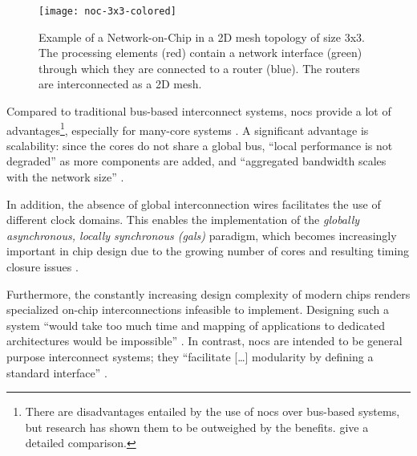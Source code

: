 \begin{figure}
    \centering
    \texttt{[image: noc-3x3-colored]}
    \caption[Example of a 3x3 mesh NoC]{Example of a Network-on-Chip in a 2D mesh topology of size 3x3. The processing elements (red) contain a network interface
    (green) through which they are connected to a router (blue). The routers are interconnected as a 2D mesh.}
    \label{fig:nocexample}
\end{figure}

Compared to traditional bus-based interconnect systems, \glspl{noc} provide a lot of advantages\footnote{There are disadvantages entailed by
the use of \glspl{noc} over bus-based systems, but research has shown them to be outweighed by the benefits. \citeauthor{tatas16designingnocs}
\cite{tatas16designingnocs} give a detailed comparison.}, especially for many-core systems
\cite[5\psqq]{tatas16designingnocs}. A significant advantage is scalability: since the cores do not share a global bus, \enquote{local performance is not
degraded} \cite[6]{tatas16designingnocs} as more components are added, and \enquote{aggregated bandwidth scales with the network size}
\cite[6]{tatas16designingnocs}.

In addition, the absence of global interconnection wires facilitates the use of different clock domains. This enables the implementation of the
\textit{globally asynchronous, locally synchronous (\gls{gals})} paradigm, which becomes increasingly important in chip design due to the growing
number of cores and resulting timing closure issues \cites[3]{kumar02networkonchip}[2]{ivanov05nocintroduction}.

Furthermore, the constantly increasing design complexity of modern chips \cite{mack11mooreslaw} renders specialized on-chip
interconnections infeasible to implement. Designing such a system \enquote{would take too much time and mapping of applications to dedicated
architectures would be impossible} \cite[1]{kumar02networkonchip}. In contrast, \glspl{noc} are intended to be general purpose interconnect systems; they
\enquote{facilitate […] modularity by defining a standard interface} \cite[1]{dally01routepacketsnotwires}.


